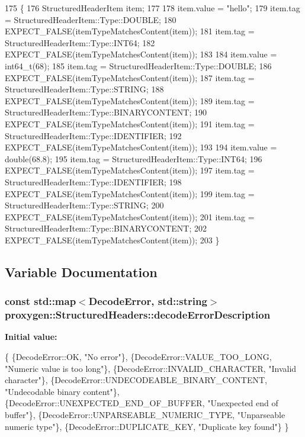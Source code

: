 \begin{DoxyCode}
175                                                                       \{
176   StructuredHeaderItem item;
177 
178   item.value = \textcolor{stringliteral}{"hello"};
179   item.tag = StructuredHeaderItem::Type::DOUBLE;
180   EXPECT\_FALSE(itemTypeMatchesContent(item));
181   item.tag = StructuredHeaderItem::Type::INT64;
182   EXPECT\_FALSE(itemTypeMatchesContent(item));
183 
184   item.value = int64\_t(68);
185   item.tag = StructuredHeaderItem::Type::DOUBLE;
186   EXPECT\_FALSE(itemTypeMatchesContent(item));
187   item.tag = StructuredHeaderItem::Type::STRING;
188   EXPECT\_FALSE(itemTypeMatchesContent(item));
189   item.tag = StructuredHeaderItem::Type::BINARYCONTENT;
190   EXPECT\_FALSE(itemTypeMatchesContent(item));
191   item.tag = StructuredHeaderItem::Type::IDENTIFIER;
192   EXPECT\_FALSE(itemTypeMatchesContent(item));
193 
194   item.value = double(68.8);
195   item.tag = StructuredHeaderItem::Type::INT64;
196   EXPECT\_FALSE(itemTypeMatchesContent(item));
197   item.tag = StructuredHeaderItem::Type::IDENTIFIER;
198   EXPECT\_FALSE(itemTypeMatchesContent(item));
199   item.tag = StructuredHeaderItem::Type::STRING;
200   EXPECT\_FALSE(itemTypeMatchesContent(item));
201   item.tag = StructuredHeaderItem::Type::BINARYCONTENT;
202   EXPECT\_FALSE(itemTypeMatchesContent(item));
203 \}
\end{DoxyCode}


\subsection{Variable Documentation}
\subsubsection[{decode\+Error\+Description}]{\setlength{\rightskip}{0pt plus 5cm}const std\+::map$<${\bf Decode\+Error}, std\+::string$>$ proxygen\+::\+Structured\+Headers\+::decode\+Error\+Description\hspace{0.3cm}{\ttfamily [static]}}\label{namespaceproxygen_1_1StructuredHeaders_aa95c94eaa045d61c111ec8583a5fc065}
{\bfseries Initial value\+:}
\begin{DoxyCode}
\{
    \{DecodeError::OK, \textcolor{stringliteral}{"No error"}\},
    \{DecodeError::VALUE\_TOO\_LONG, \textcolor{stringliteral}{"Numeric value is too long"}\},
    \{DecodeError::INVALID\_CHARACTER, \textcolor{stringliteral}{"Invalid character"}\},
    \{DecodeError::UNDECODEABLE\_BINARY\_CONTENT, \textcolor{stringliteral}{"Undecodable binary content"}\},
    \{DecodeError::UNEXPECTED\_END\_OF\_BUFFER, \textcolor{stringliteral}{"Unexpected end of buffer"}\},
    \{DecodeError::UNPARSEABLE\_NUMERIC\_TYPE, \textcolor{stringliteral}{"Unparseable numeric type"}\},
    \{DecodeError::DUPLICATE\_KEY, \textcolor{stringliteral}{"Duplicate key found"}\}
\}
\end{DoxyCode}


